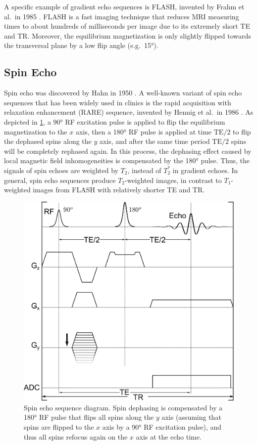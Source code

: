 A specific example of gradient echo sequences is \acs{FLASH}, invented by Frahm et al.~in 1985 \cite{1986_FLASH}. FLASH is a fast imaging technique that reduces MRI measuring times to about hundreds of milliseconds per image due to its extremely short TE and TR. Moreover, the equilibrium magnetization is only slightly flipped towards the transversal plane by a low flip angle (e.g.~\ang{15}).

\subsection{Spin Echo}
Spin echo was discovered by Hahn in 1950 \cite{1950_spin-echo}. A well-known variant of spin echo sequences that has been widely used in clinics is the rapid acquisition with relaxation enhancement (\acs{RARE}) sequence, invented by Hennig et al.~in 1986 \cite{1986_RARE}. As depicted in \cref{Fig:mri-seq-se-cart}, a \ang{90} RF excitation pulse is applied to flip the equilibrium magnetization to the $x$ axis, then a \ang{180} RF pulse is applied at time $\text{TE}/2$ to flip the dephased spins along the $y$ axis, and after the same time period $\text{TE}/2$ spins will be completely rephased again. In this process, the dephasing effect caused by local magnetic field inhomogeneities is compensated by the \ang{180} pulse. Thus, the signals of spin echoes are weighted by $T_2$, instead of $T_2^*$ in gradient echoes. In general, spin echo sequences produce $T_2$-weighted images, in contrast to $T_1$-weighted images from FLASH with relatively shorter TE and TR.
\begin{figure}[tb]
  \centering
  \includegraphics[scale=1]{fig/mri-seq-se-cart.png}
  \caption{Spin echo sequence diagram. Spin dephasing is compensated by a \ang{180} RF pulse that flips all spins along the $y$ axis (assuming that spins are flipped to the $x$ axis by a \ang{90} RF excitation pulse), and thus all spins refocus again on the $x$ axis at the echo time.} \label{Fig:mri-seq-se-cart}
\end{figure}



